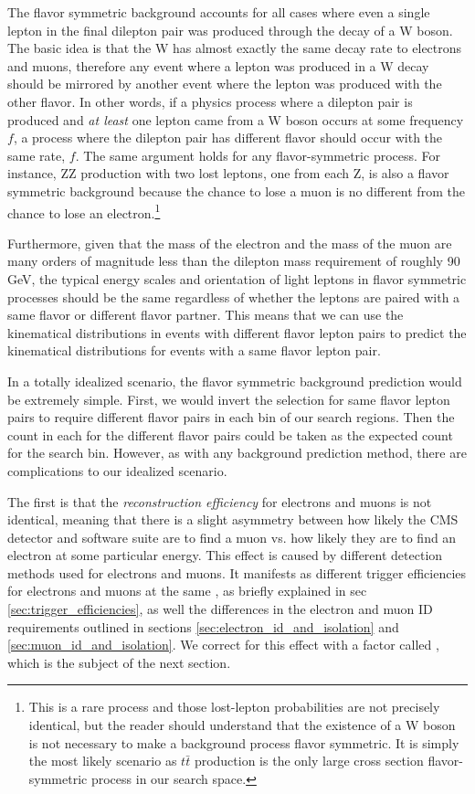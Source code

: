     The flavor symmetric background accounts for all cases where even a single lepton in the final dilepton pair was produced through the decay of a W boson. The basic idea is that the W has almost exactly the same decay rate to electrons and muons, therefore any event where a lepton was produced in a W decay should be mirrored by another event where the lepton was produced with the other flavor. In other words, if a physics process where a dilepton pair is produced and \emph{at least} one lepton came from a W boson occurs at some frequency $f$, a process where the dilepton pair has different flavor should occur with the same rate, $f$. The same argument holds for any flavor-symmetric process. For instance, ZZ production with two lost leptons, one from each Z, is also a flavor symmetric background because the chance to lose a muon is no different from the chance to lose an electron.\footnote{This is a rare process and those lost-lepton probabilities are not precisely identical, but the reader should understand that the existence of a W boson is not necessary to make a background process flavor symmetric. It is simply the most likely scenario as $t\bar{t}$ production is the only large cross section flavor-symmetric process in our search space.}

    Furthermore, given that the mass of the electron and the mass of the muon are many orders of magnitude less than the dilepton mass requirement of roughly 90 GeV, the typical energy scales and orientation of light leptons in flavor symmetric processes should be the same regardless of whether the leptons are paired with a same flavor or different flavor partner. This means that we can use the kinematical distributions in events with different flavor lepton pairs to predict the kinematical distributions for events with a same flavor lepton pair.

    In a totally idealized scenario, the flavor symmetric background prediction would be extremely simple. First, we would invert the selection for same flavor lepton pairs to require different flavor pairs in each \MET bin of our search regions. Then the count in each \MET for the different flavor pairs could be taken as the expected count for the search bin. However, as with any background prediction method, there are complications to our idealized scenario. 

    The first is that the \emph{reconstruction efficiency} for electrons and muons is not identical, meaning that there is a slight asymmetry between how likely the CMS detector and software suite are to find a muon vs. how likely they are to find an electron at some particular energy. This effect is caused by different detection methods used for electrons and muons. It manifests as different trigger efficiencies for electrons and muons at the same \pt, as briefly explained in sec \ref{sec:trigger_efficiencies}, as well the differences in the electron and muon ID requirements outlined in sections \ref{sec:electron_id_and_isolation} and \ref{sec:muon_id_and_isolation}. We correct for this effect with a factor called \rsfof, which is the subject of the next section.

